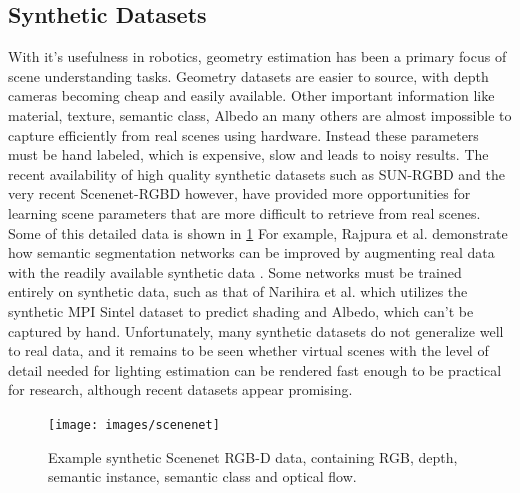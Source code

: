 \documentclass[ %
                    author={Gavin Parker},
                supervisor={Dr. Neill Campbell},
                    degree={MEng},
                     title={Deep Learning for Illumination Estimation from Stereo Images},
                  subtitle={},
                      type={Research},
                      year={2018} ]{dissertation}
\begin{document}
\subsection{Synthetic Datasets}
With it's usefulness in robotics, geometry estimation has been a primary focus of scene understanding tasks. Geometry datasets are easier to source, with depth cameras becoming cheap and easily available. Other important information like material, texture, semantic class, Albedo an many others are almost impossible to capture efficiently from real scenes using hardware. Instead these parameters must be hand labeled, which is expensive, slow and leads to noisy results. The recent availability of high quality synthetic datasets such as SUN-RGBD \cite{song2015sun} and the very recent Scenenet-RGBD \cite{McCormac:etal:arXiv2016} however, have provided more opportunities for learning scene parameters that are more difficult to retrieve from real scenes. Some of this detailed data is shown in \ref{fig:rgbd} For example, Rajpura et al. demonstrate how semantic segmentation networks can be improved by augmenting real data with the readily available synthetic data \cite{DBLP:journals/corr/abs-1709-00849}. Some networks must be trained entirely on synthetic data, such as that of Narihira et al. which utilizes the synthetic MPI Sintel dataset to predict shading and Albedo, which can't be captured by hand. Unfortunately, many synthetic datasets do not generalize well to real data, and it remains to be seen whether virtual scenes with the level of detail needed for lighting estimation can be rendered fast enough to be practical for research, although recent datasets appear promising.
\begin{figure}[H]
\centering
\texttt{[image: images/scenenet]}
\caption{Example synthetic Scenenet RGB-D data, containing RGB, depth, semantic instance, semantic class and optical flow.}
\label{fig:rgbd}
\end{figure}
\end{document}
